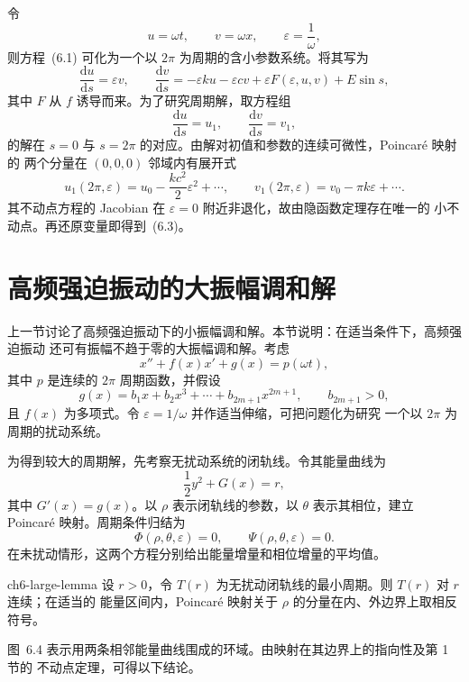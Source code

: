 令
\[
  u=\omega t,\qquad v=\omega x,\qquad \varepsilon=\frac1\omega,
\]
则方程~(6.1) 可化为一个以 $2\pi$ 为周期的含小参数系统。将其写为
\[
  \frac{\mathrm du}{\mathrm ds}=\varepsilon v,\qquad
  \frac{\mathrm dv}{\mathrm ds}=-\varepsilon ku-\varepsilon cv+\varepsilon F(\varepsilon,u,v)
     +E\sin s, \tag{6.5}
\]
其中 $F$ 从 $f$ 诱导而来。为了研究周期解，取方程组
\[
  \frac{\mathrm du}{\mathrm ds}=u_1,\qquad
  \frac{\mathrm dv}{\mathrm ds}=v_1, \tag{6.6}
\]
的解在 $s=0$ 与 $s=2\pi$ 的对应。由解对初值和参数的连续可微性，Poincar\'e 映射的
两个分量在 $(0,0,0)$ 邻域内有展开式
\[
  u_1(2\pi,\varepsilon)=u_0-\frac{kc^2}{2}\varepsilon^2+\cdots,
  \qquad
  v_1(2\pi,\varepsilon)=v_0-\pi k\varepsilon+\cdots . \tag{6.10}
\]
其不动点方程的 Jacobian 在 $\varepsilon=0$ 附近非退化，故由隐函数定理存在唯一的
小不动点。再还原变量即得到~(6.3)。

\section{高频强迫振动的大振幅调和解}

上一节讨论了高频强迫振动下的小振幅调和解。本节说明：在适当条件下，高频强迫振动
还可有振幅不趋于零的大振幅调和解。考虑
\[
  x''+f(x)x'+g(x)=p(\omega t), \tag{7.1}
\]
其中 $p$ 是连续的 $2\pi$ 周期函数，并假设
\[
  g(x)=b_1x+b_2x^3+\cdots+b_{2m+1}x^{2m+1},\qquad b_{2m+1}>0, \tag{7.2}
\]
且 $f(x)$ 为多项式。令 $\varepsilon=1/\omega$ 并作适当伸缩，可把问题化为研究
一个以 $2\pi$ 为周期的扰动系统。

为得到较大的周期解，先考察无扰动系统的闭轨线。令其能量曲线为
\[
  \frac12y^2+G(x)=r,
\]
其中 $G'(x)=g(x)$。以 $\rho$ 表示闭轨线的参数，以 $\theta$ 表示其相位，建立
Poincar\'e 映射。周期条件归结为
\[
  \Phi(\rho,\theta,\varepsilon)=0,\qquad
  \Psi(\rho,\theta,\varepsilon)=0. \tag{7.5}
\]
在未扰动情形，这两个方程分别给出能量增量和相位增量的平均值。

\begin{lemma}{}{ch6-large-lemma}
设 $r>0$，令 $T(r)$ 为无扰动闭轨线的最小周期。则 $T(r)$ 对 $r$ 连续；在适当的
能量区间内，Poincar\'e 映射关于 $\rho$ 的分量在内、外边界上取相反符号。
\end{lemma}


图~6.4 表示用两条相邻能量曲线围成的环域。由映射在其边界上的指向性及第 1 节的
不动点定理，可得以下结论。

